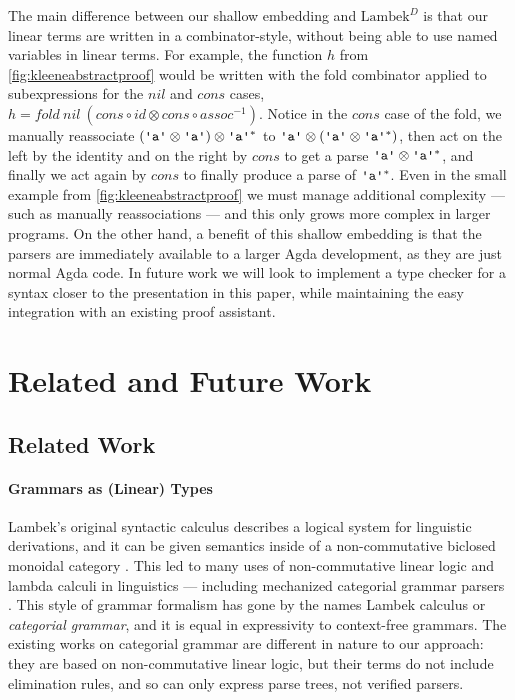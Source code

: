 \documentclass[acmsmall,nonacm]{acmart}
\newcommand{\theoryabbv}{$\textrm{Lambek}^D$\xspace}
\newcommand{\literal}[1]{\texttt{\textquotesingle#1\textquotesingle}}
\begin{document}
{The main difference
between our shallow embedding and \theoryabbv is that our linear terms
are written in a combinator-style, without being able to use named
variables in linear terms. For example, the function $h$ from
\cref{fig:kleeneabstractproof} would be written with the fold combinator applied
to subexpressions for the $nil$ and $cons$ cases,
\(
h = fold~nil~(cons \circ id \otimes cons \circ assoc^{-1})
\). Notice in the $cons$ case of the fold, we manually reassociate
$(\literal{a} \otimes \literal{a}) \otimes \literal{a}^{*}$ to
$\literal{a} \otimes (\literal{a} \otimes \literal{a}^{*})$, then act on the
left by the identity and on the right by $cons$ to get a parse
$\literal{a} \otimes \literal{a}^{*}$, and finally we act again by $cons$ to
finally produce a parse of $\literal{a}^{*}$.
Even in the small example from
\cref{fig:kleeneabstractproof} we must manage additional complexity --- such as
manually reassociations --- and
this only grows more complex in larger programs. On the other hand, a benefit of this shallow embedding is that
the parsers are immediately available to a larger Agda development, as
they are just normal Agda code. In future work we will look to
implement a type checker for a syntax closer to the presentation in
this paper, while maintaining the easy integration with an
existing proof assistant.

\section{Related and Future Work}
\label{sec:discussion}

\subsection{Related Work}
\paragraph{Grammars as (Linear) Types}
Lambek's original syntactic calculus \cite{lambek58} describes a
logical system for linguistic derivations, and it can be given
semantics inside of a non-commutative biclosed monoidal category
\cite{lambek1988categorial}. This led to many uses of non-commutative
linear logic and lambda calculi in linguistics
\cite{buszkowskiTypeLogicsGrammar2003} --- including mechanized
categorial grammar parsers \cite{Guillaume2024,ranta-2011}. This style
of grammar formalism has gone by the names Lambek calculus or
\emph{categorial grammar}, and it is equal in expressivity to
context-free grammars.  The existing works on categorial grammar are
different in nature to our approach: they are based on non-commutative
linear logic, but their terms do not include elimination rules, and so
can only express parse trees, not verified parsers.

}
\end{document}
